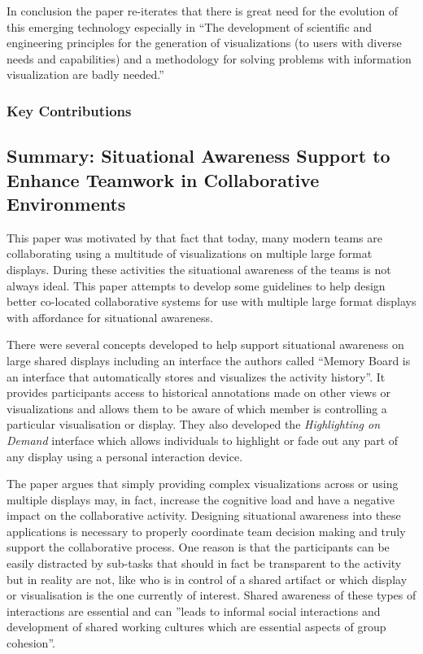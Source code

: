 \documentclass{sig-alternate}
\begin{document}
In conclusion the paper re-iterates that there is great need for the evolution
of this emerging technology especially in ``The development of scientific and
engineering principles for the generation of visualizations  (to users with
diverse needs and capabilities) and a methodology for solving problems with
information visualization are badly needed.''

\subsubsection{Key Contributions}
\subsection{Summary: Situational Awareness Support to Enhance Teamwork in
Collaborative Environments \cite{Kulyk:2008:SituationalAwareness}} This paper
was motivated by that fact that today, many modern teams are collaborating using
a multitude of visualizations on multiple large format displays. During these
activities the situational awareness of the teams is not always ideal. This
paper attempts to develop some guidelines to help design better co-located
collaborative systems for use with multiple large format displays with
affordance for situational awareness.

There were several concepts developed to help support situational awareness on
large shared displays including an interface the authors called ``Memory Board
is an interface that automatically stores and visualizes the activity history''.
It provides participants access to historical annotations made on other views or
visualizations and allows them to be aware of which member is controlling a
particular visualisation or display. They also developed the \emph{Highlighting
on Demand} interface which allows individuals to highlight or fade out any part
of any display using a personal interaction device.

The paper argues that simply providing complex visualizations across or using
multiple displays may, in fact, increase the cognitive load and have a negative
impact on the collaborative activity. Designing situational awareness into these
applications is necessary to properly coordinate team decision making and truly
support the collaborative process. One reason is that the participants can be
easily distracted by sub-tasks that should in fact be transparent to the
activity but in reality are not, like who is in control of a shared artifact or
which display or visualisation is the one currently of interest. Shared
awareness of these types of interactions are essential and can ''leads to
informal social interactions and development of shared working cultures which
are essential aspects of group cohesion''.
\end{document}
